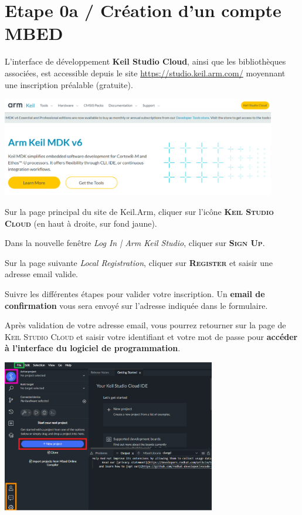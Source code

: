 \documentclass[a4paper,11pt,titlepage]{article} %
\begin{document}
\section{Etape 0a / Création d'un compte MBED}

L'interface de développement \textbf{Keil Studio Cloud}, ainsi que les bibliothèques associées, est accessible depuis le site \href{https://studio.keil.arm.com/}{https://studio.keil.arm.com/} moyennant une inscription préalable (gratuite).

\begin{center}
	\includegraphics[width=0.9\textwidth]{images/keil_arm_com.png}
\end{center}

Sur la page principal du site de Keil.Arm, cliquer sur l'icône \textsc{\textbf{Keil Studio Cloud}} (en haut à droite, sur fond jaune).

Dans la nouvelle fenêtre \textsl{Log In | Arm Keil Studio}, cliquer sur \textsc{\textbf{Sign Up}}.

Sur la page suivante \textsl{Local Registration}, cliquer sur \textsc{\textbf{Register}} et saisir une adresse email valide.

Suivre les différentes étapes pour valider votre inscription. Un \textbf{email de confirmation} vous sera envoyé sur l'adresse indiquée dans le formulaire.

Après validation de votre adresse email, vous pourrez retourner sur la page de \textsc{Keil Studio Cloud} et saisir votre identifiant et votre mot de passe pour \textbf{accéder à l'interface du logiciel de programmation}.


\begin{center}
	\includegraphics[width=0.7\textwidth]{images/keil_cloud_plus.png}
\end{center}
\end{document}
